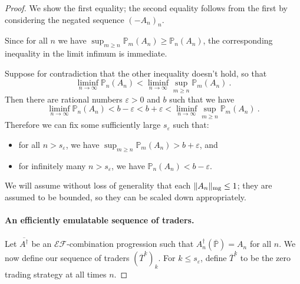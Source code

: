 \documentclass[authordate,onecolumn,noenvironments]{miri-tech-article}
\numberwithin{equation}{subsection}
\newcommand{\seq}[1]{{\overline{#1}}}
\newcommand{\nn}{n}
\newcommand{\exfeatures}{\mathcal{E\!F}} %
\newcommand{\aff}{A}
\newcommand{\trade}{T}%
\newcommand{\Trader}{\seq{\trade}} %
\newcommand{\gens}{\dagger}
\newcommand{\gen}[1]{{#1^\gens}}
\newcommand{\magnit}[1]{{\|#1\|_{\rm mg}}} %
\newcommand{\BelState}{\mathbb{P}}
\newcommand{\pt}{\BelState}
\newcommand{\MP}{\seq{\pt}}
\newcommand{\localportfoliovalue}{b}
\begin{document}
\begin{proof}
  We show the first equality; the second equality follows from the first by considering the negated sequence $(-\aff_n)_n$. 

  Since for all $n$ we have 
   $ \sup_{m \ge n}\pt_{m}(\aff_{n}) \ge \pt_{\nn}(\aff_{\nn}) $, the corresponding inequality in the limit infimum is immediate. 

Suppose for contradiction that the other inequality doesn't hold, so that 
%
  \[
    \liminf_{\nn\to\infty}\pt_{\nn}(\aff_{\nn}) < \liminf_{\nn\rightarrow\infty}\sup_{m \ge n}\pt_{m}(\aff_{n})\ .
  \]
%
  Then there are rational numbers $\varepsilon>0$ and $\localportfoliovalue$  such that
we have 
%
\[ \liminf_{\nn\to\infty} \pt_{\nn}(\aff_{\nn})<  \localportfoliovalue - \varepsilon<  \localportfoliovalue + \varepsilon<\liminf_{\nn\to\infty} 
\sup_{m \ge n}\pt_{m}(\aff_{n})\ .\]
%  
Therefore we
can fix some sufficiently large $s_\varepsilon$ such that:
%
\begin{itemize}
\item for all $n>s_\varepsilon$, we have
$\sup_{m \ge n}\pt_{m}(\aff_{n})
> \localportfoliovalue + \varepsilon$, and 
\item for infinitely many $n> s_\varepsilon$, we have $\pt_{\nn}(\aff_{\nn})<\localportfoliovalue - \varepsilon$.
\end{itemize}
%

We will assume without loss of generality that each $\magnit{\aff_n} \leq 1$; they are assumed to be bounded, so they can be scaled down appropriately.



\paragraph{An efficiently emulatable sequence of traders.}
Let $\seq{\gen\aff}$ be an $\exfeatures$-combination progression such that $\gen{\aff_n}(\MP) = \aff_n$ for all $n$.
We now define our sequence of traders $(\Trader^k)_k$. 
For $k \leq s_\varepsilon$, define
$\Trader^k$ to be the zero trading strategy at all times $n$.


\end{proof}
\end{document}
